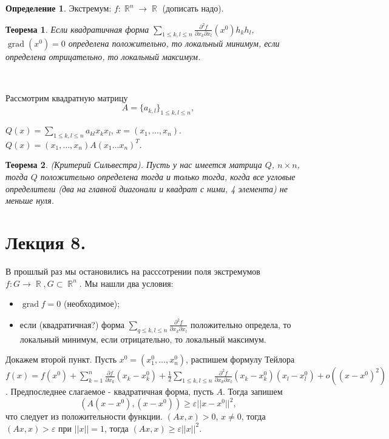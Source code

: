 \documentclass[a4paper,100pt]{article}
\theoremstyle{indented}
\newtheorem{theorem}{Теорема}
\theoremstyle{definition}
\newtheorem{defn}{Определение}
\theoremstyle{remark}
\DeclareMathOperator{\RR}{\mathbb{R}}
\DeclareMathOperator{\grad}{grad}
\begin{document}
\begin{defn}
    Экстремум: $f:\RR^n\rightarrow \RR$ (дописать надо).
\end{defn}

\begin{theorem}
    Если квадратичная форма $\sum_{1\leq k, l\leq n}\frac{\partial^2 f}{\partial x_k \partial x_l}(x^0)h_kh_l$, $\grad (x^0)=0$ определена положительно, то локальный минимум, если определена отрицательно, то локальный максимум.
\end{theorem}\

Рассмотрим квадратную матрицу 
\[
    A = \{a_{k, l}\}_{1\leq k, l \leq n},
\]    
    
$Q(x)=\sum_{1\leq k, l \leq n}a_{k l}x_k x_l$,  $x=(x_1, \ldots, x_n)$. $Q(x)=(x_1, \ldots, x_n)A(x_1\ldots x_n)^T$.\\

\begin{theorem}
    (Критерий Сильвестра). Пусть у нас имеется матрица $Q$, $n\times n$, тогда $Q$ положительно определена тогда и только тогда, когда все угловые определители (два на главной диагонали и квадрат с ними, 4 элемента) не меньше нуля.
\end{theorem}

\section{Лекция 8.}

В прошлый раз мы остановились на расссотрении поля экстремумов $f: G \rightarrow \RR, G \subset \RR^n$. Мы нашли два условия: 

\begin{itemize}
    \item $\grad f =0$ (необходимое); 
    \item если (квадратичная?) форма $\sum_{q\leq k, l\leq n}\frac{\partial^2 f}{\partial x_k \partial x_l}$ положительно определа, то локальный минимум, если отрицательно, то локальный максимум.
\end{itemize}

Докажем второй пункт. Пусть $x^0=(x_1^0, \ldots, x_n^0)$, распишем формулу Тейлора $f(x)=f(x^0)+\sum_{k=1}^n\frac{\partial f}{\partial x_k}(x_k-x_k^0)+\frac{1}{2}\sum_{1\leq k, l \leq n}\frac{\partial^2 f}{\partial x_k \partial x_l}(x_k-x_k^0)(x_l-x_l^0)+o((x-x^0)^2)$. Предпоследнее слагаемое - квадратичная форма, пусть $A$. Тогда запишем
\[
    (A(x-x^0), (x-x^0))\geq \varepsilon ||x-x^0||^2, 
\]
что следует из положительности функции. $(Ax, x)>0$, $x\neq 0$, тогда $(Ax, x)>\varepsilon$ при $||x||=1$, тогда $(Ax, x)\geq \varepsilon ||x||^2$. \\ 
\end{document}
